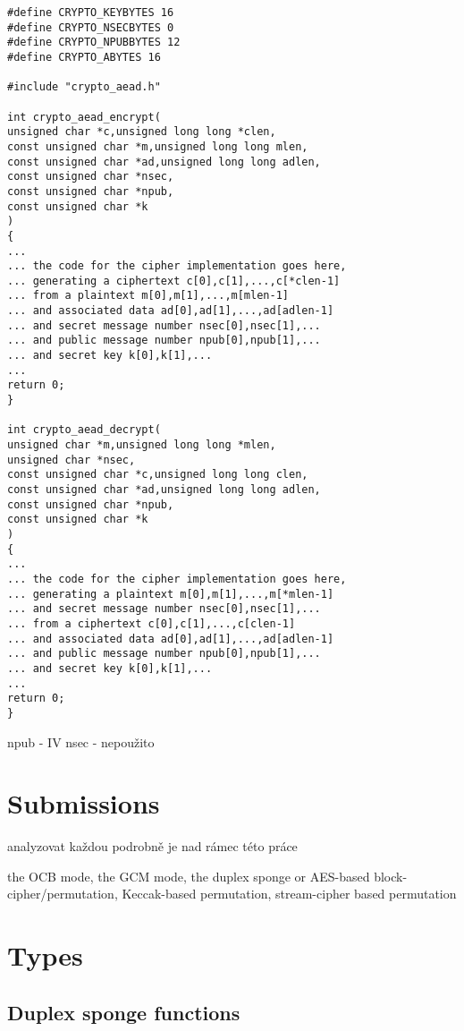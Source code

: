 \begin{lstlisting}
#define CRYPTO_KEYBYTES 16
#define CRYPTO_NSECBYTES 0
#define CRYPTO_NPUBBYTES 12
#define CRYPTO_ABYTES 16

#include "crypto_aead.h"

int crypto_aead_encrypt(
unsigned char *c,unsigned long long *clen,
const unsigned char *m,unsigned long long mlen,
const unsigned char *ad,unsigned long long adlen,
const unsigned char *nsec,
const unsigned char *npub,
const unsigned char *k
)
{
...
... the code for the cipher implementation goes here,
... generating a ciphertext c[0],c[1],...,c[*clen-1]
... from a plaintext m[0],m[1],...,m[mlen-1]
... and associated data ad[0],ad[1],...,ad[adlen-1]
... and secret message number nsec[0],nsec[1],...
... and public message number npub[0],npub[1],...
... and secret key k[0],k[1],...
...
return 0;
}

int crypto_aead_decrypt(
unsigned char *m,unsigned long long *mlen,
unsigned char *nsec,
const unsigned char *c,unsigned long long clen,
const unsigned char *ad,unsigned long long adlen,
const unsigned char *npub,
const unsigned char *k
)
{
...
... the code for the cipher implementation goes here,
... generating a plaintext m[0],m[1],...,m[*mlen-1]
... and secret message number nsec[0],nsec[1],...
... from a ciphertext c[0],c[1],...,c[clen-1]
... and associated data ad[0],ad[1],...,ad[adlen-1]
... and public message number npub[0],npub[1],...
... and secret key k[0],k[1],...
...
return 0;
}
\end{lstlisting}

npub - IV
nsec - nepoužito

\section{Submissions}

analyzovat každou podrobně je nad rámec této práce

the OCB mode, the GCM mode, the duplex sponge or AES-based block-cipher/permutation, Keccak-based permutation, stream-cipher based permutation

\section{Types}

\subsection{Duplex sponge functions}


